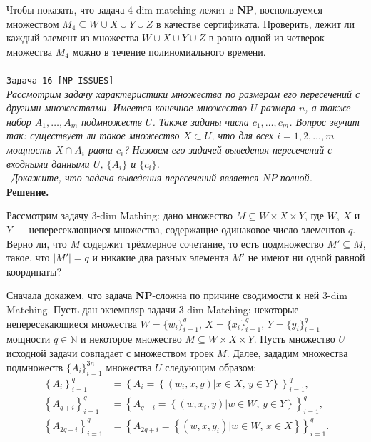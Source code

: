 \documentclass[10pt]{article}
\begin{document}
\medskip\par Чтобы показать, что задача 4-dim matching лежит в \textbf{NP}, воспользуемся множеством $M_4\subseteq W\cup X\cup Y\cup Z$ в качестве сертификата. Проверить, лежит ли каждый элемент из множества $W\cup X\cup Y\cup Z$ в ровно одной из четверок множества $M_4$ можно в течение полиномиального времени.
\ \\[0.5 cm]
\hline
\ \\[0.5 cm]
{\large\texttt{Задача 16 [NP-ISSUES]}}
\ \\[0.1cm]
\textit{Рассмотрим задачу характеристики множества по размерам его пересечений
с другими множествами. Имеется конечное множество $U$ размера $n$, а также
набор $A_1, \dots, A_m$ подмножеств $U$. Также заданы числа $c_1, \dots, c_m$. Вопрос звучит так: существует ли такое множество $X\subset U$, что для всех $i = 1, 2, \dots, m$ мощность $X \cap A_i$ равна $c_i$? Назовем его задачей выведения пересечений с входными данными $U$, $\{A_i\}$ и $\{c_i\}$.
\\ \
Докажите, что задача выведения пересечений является $NP$-полной.
}
\ \\[0.3cm]
\textbf{Решение.} 
\medskip\par 
Рассмотрим задачу 3-dim Mathing: дано множество  $M \subseteq W\times X\times Y$, где $W$, $X$ и $Y$ --- непересекающиеся множества, содержащие одинаковое число элементов $q$. Верно ли, что $M$ содержит трёхмерное сочетание, то есть подмножество $M'\subseteq M$, такое, что $|M'|=q$ и никакие два разных элемента $M'$ не имеют ни одной равной координаты?
\medskip\par
Сначала докажем, что задача \textbf{NP}-сложна по причине сводимости к ней 3-dim Matching. Пусть дан экземпляр задачи 3-dim Matching: некоторые непересекающиеся множества $W=\{w_i\}_{i=1}^q$, $X=\{x_i\}_{i=1}^q$, $Y=\{y_i\}_{i=1}^q$ мощности $q\in\mathbb{N}$ и некоторое множество $M\subseteq W\times X\times Y$. Пусть множество $U$ исходной задачи совпадает с множеством троек $M$. Далее, зададим множества подмножеств $\{A_i\}_{i=1}^{3n}$ множества $U$ следующим образом: 
\begin{align*}
\left\{A_{i}\right\}_{i=1}^q &=  \left\{A_i=\left\{(w_i, x, y)|x\in X,\, y\in Y\right\}\right\}_{i=1}^q,\\
\left\{A_{q+i}\right\}_{i=1}^q &= \left\{A_{q+i}=\left\{(w, x_i, y)|w\in W,\, y\in Y\right\}\right\}_{i=1}^q,\\
\left\{A_{2q+i}\right\}_{i=1}^q &= \left\{A_{2q+i}=\left\{(w, x, y_i)|w\in W,\, x\in X\right\}\right\}_{i=1}^q.
\end{align*}
\end{document}

